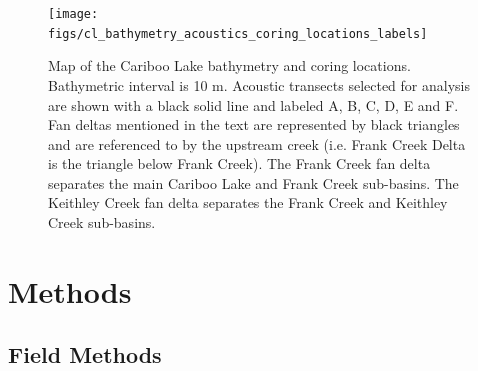 \documentclass[Royal,times,doublespace,sageh]{sagej}
\begin{document}
\begin{figure}

{\centering \texttt{[image: figs/cl\_bathymetry\_acoustics\_coring\_locations\_labels]} 

}

\caption{Map of the Cariboo Lake bathymetry and coring locations. Bathymetric interval is 10 m. Acoustic transects selected for analysis are shown with a black solid line and labeled A, B, C, D, E and F. Fan deltas mentioned in the text are represented by black triangles and are referenced to by the upstream creek (i.e. Frank Creek Delta is the triangle below Frank Creek). The Frank Creek fan delta separates the main Cariboo Lake and Frank Creek sub-basins. The Keithley Creek fan delta separates the Frank Creek and Keithley Creek sub-basins.}\label{fig:map-lake}
\end{figure}

\hypertarget{methods}{%
\section{Methods}\label{methods}}

\hypertarget{field-methods}{%
\subsection{Field Methods}\label{field-methods}}
\end{document}
